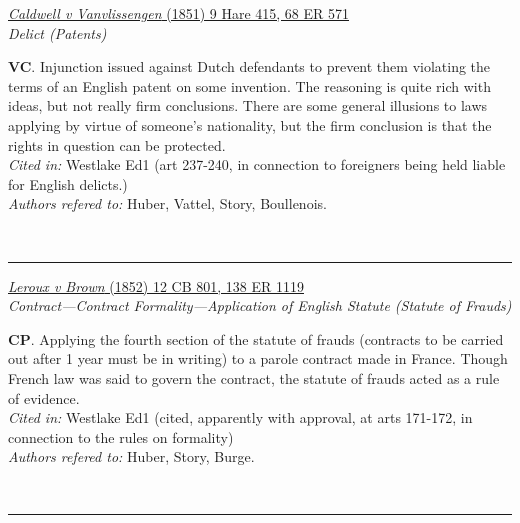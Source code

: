 \documentclass[twoside]{article}
\begin{document}
        \begin{small}
        \begin{center}
        \href{https://heinonline.org/HOL/P?h=hein.engrep/engre0068&i=577}{\textit{Caldwell v Vanvlissengen} (1851) 9 Hare 415, 68 ER 571} \label{114} \\ 
\textit{Delict (Patents)}\\
        \end{center}
        \textbf{VC}. Injunction issued against Dutch defendants to prevent them violating the terms of an English patent on some invention. The reasoning is quite rich with ideas, but not really firm conclusions. There are some general illusions to laws applying by virtue of someone’s nationality, but the firm conclusion is that the rights in question can be protected.\\\textit{Cited in: }Westlake Ed1 (art 237-240, in connection to foreigners being held liable for English delicts.)\\\textit{Authors refered to: }Huber, Vattel, Story, Boullenois.
        \end{small}\\
        \rule{\textwidth}{0.5pt}
        

        \begin{small}
        \begin{center}
        \href{https://heinonline.org/HOL/P?h=hein.engrep/engrg0138&i=1123}{\textit{Leroux v Brown} (1852) 12 CB 801, 138 ER 1119} \label{103} \\ 
\textit{Contract---Contract Formality---Application of English Statute (Statute of Frauds)}\\
        \end{center}
        \textbf{CP}. Applying the fourth section of the statute of frauds (contracts to be carried out after 1 year must be in writing) to a parole contract made in France. Though French law was said to govern the contract, the statute of frauds acted as a rule of evidence.\\\textit{Cited in: }Westlake Ed1 (cited, apparently with approval, at arts 171-172, in connection to the rules on formality)\\\textit{Authors refered to: }Huber, Story, Burge.
        \end{small}\\
        \rule{\textwidth}{0.5pt}
        
\end{document}

